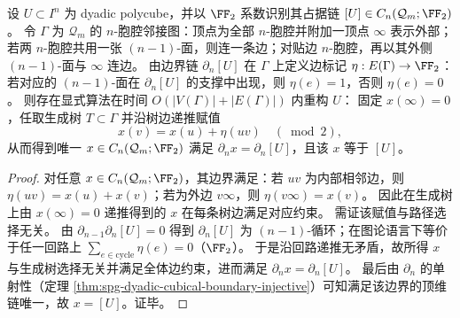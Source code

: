 \begin{theorem}\label{thm:spg-linear-time-bulk-decode-from-boundary}
设 \(U\subset I^n\) 为 dyadic polycube，并以 \(\FF_2\) 系数识别其占据链 \([U]\in C_n(\mathcal Q_m;\FF_2)\)。
令 \(\Gamma\) 为 \(\mathcal Q_m\) 的 \(n\)-胞腔邻接图：顶点为全部 \(n\)-胞腔并附加一顶点 \(\infty\) 表示外部；若两 \(n\)-胞腔共用一张 \((n-1)\)-面，则连一条边；对贴边 \(n\)-胞腔，再以其外侧 \((n-1)\)-面与 \(\infty\) 连边。
由边界链 \(\partial_n[U]\) 在 \(\Gamma\) 上定义边标记 \(\eta:E(\Gamma)\to\FF_2\)：若对应的 \((n-1)\)-面在 \(\partial_n[U]\) 的支撑中出现，则 \(\eta(e)=1\)，否则 \(\eta(e)=0\)。
则存在显式算法在时间 \(O(|V(\Gamma)|+|E(\Gamma)|)\) 内重构 \(U\)：
固定 \(x(\infty)=0\)，任取生成树 \(T\subset\Gamma\) 并沿树边递推赋值
\[
x(v)=x(u)+\eta(uv)\quad(\bmod 2),
\]
从而得到唯一 \(x\in C_n(\mathcal Q_m;\FF_2)\) 满足 \(\partial_n x=\partial_n[U]\)，且该 \(x\) 等于 \([U]\)。
\end{theorem}
\begin{proof}
对任意 \(x\in C_n(\mathcal Q_m;\FF_2)\)，其边界满足：若 \(uv\) 为内部相邻边，则 \(\eta(uv)=x(u)+x(v)\)；若为外边 \(v\infty\)，则 \(\eta(v\infty)=x(v)\)。
因此在生成树上由 \(x(\infty)=0\) 递推得到的 \(x\) 在每条树边满足对应约束。
需证该赋值与路径选择无关。
由 \(\partial_{n-1}\partial_n[U]=0\) 得到 \(\partial_n[U]\) 为 \((n-1)\)-循环；在图论语言下等价于任一回路上 \(\sum_{e\in\mathrm{cycle}}\eta(e)=0\)（\(\FF_2\)）。
于是沿回路递推无矛盾，故所得 \(x\) 与生成树选择无关并满足全体边约束，进而满足 \(\partial_n x=\partial_n[U]\)。
最后由 \(\partial_n\) 的单射性（定理 \ref{thm:spg-dyadic-cubical-boundary-injective}）可知满足该边界的顶维链唯一，故 \(x=[U]\)。证毕。
\end{proof}

